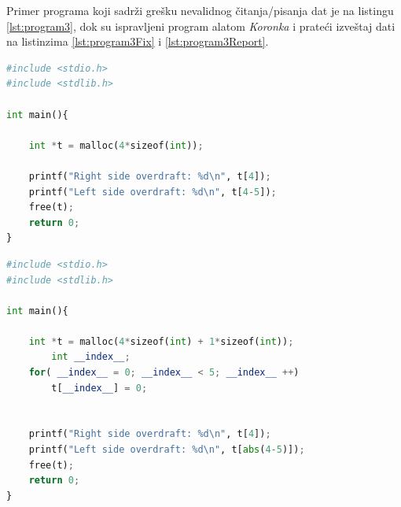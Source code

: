 \documentclass[12pt,oneside]{memoir}
\theoremstyle{plain}
\theoremstyle{definition}
\begin{document}
Primer programa koji sadrži grešku nevalidnog čitanja/pisanja dat je na listingu \ref{lst:program3}, dok su ispravljeni program alatom \textit{Koronka} i prateći izveštaj dati na listinzima \ref{lst:program3Fix} i \ref{lst:program3Report}.

\begin{lstlisting}[style=mystyle,caption={Program koji sadrži grešku nevalidnog čitanja/pisanja}, label={lst:program3},language={Python}] 
#include <stdio.h>
#include <stdlib.h>

int main(){

	int *t = malloc(4*sizeof(int));

	printf("Right side overdraft: %d\n", t[4]);
	printf("Left side overdraft: %d\n", t[4-5]);
	free(t); 
	return 0;
}
\end{lstlisting}

\begin{lstlisting}[style=mystyle,caption={Ispravljeni program sa listinga \ref{lst:program3} alatom \textit{Koronka}}, label={lst:program3Fix},language={Python}] 
#include <stdio.h>
#include <stdlib.h>

int main(){

	int *t = malloc(4*sizeof(int) + 1*sizeof(int));
		int __index__;
	for( __index__ = 0; __index__ < 5; __index__ ++)
		t[__index__] = 0;


	printf("Right side overdraft: %d\n", t[4]);
	printf("Left side overdraft: %d\n", t[abs(4-5)]);
	free(t); 
	return 0;
}
\end{lstlisting}
\end{document}
